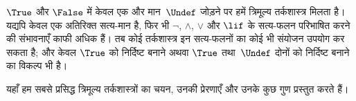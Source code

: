 \documentclass[../../../include/open-logic-section]{subfiles}
\begin{document}


$\True$ और $\False$ में केवल एक और मान~$\Undef$ जोड़ने पर हमें त्रिमूल्य
तर्कशास्त्र मिलता है। यद्यपि केवल एक अतिरिक्त सत्य-मान है, फिर भी $\lnot$,
$\land$, $\lor$ और $\lif$ के सत्य-फलन परिभाषित करने की संभावनाएँ काफी अधिक
हैं। तब कोई तर्कशास्त्र इन सत्य-फलनों का कोई भी संयोजन उपयोग कर सकता है;
और केवल $\True$ को निर्दिष्ट बनाने अथवा $\True$ तथा~$\Undef$ दोनों को
निर्दिष्ट बनाने का विकल्प भी है।

यहाँ हम सबसे प्रसिद्ध त्रिमूल्य तर्कशास्त्रों का चयन, उनकी प्रेरणाएँ और
उनके कुछ गुण प्रस्तुत करते हैं।
\end{document}
